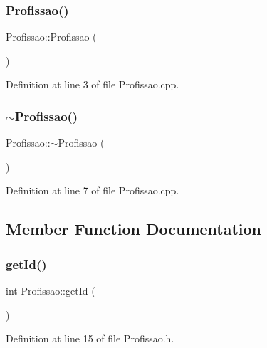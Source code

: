 \subsubsection{\texorpdfstring{Profissao()}{Profissao()}}
{\footnotesize\ttfamily Profissao\+::\+Profissao (\begin{DoxyParamCaption}{ }\end{DoxyParamCaption})}



Definition at line 3 of file Profissao.\+cpp.

\hypertarget{class_profissao_ae1f1d15fd068634e67858000dcc3f0cb}{}\label{class_profissao_ae1f1d15fd068634e67858000dcc3f0cb} 
\subsubsection{\texorpdfstring{$\sim$\+Profissao()}{~Profissao()}}
{\footnotesize\ttfamily Profissao\+::$\sim$\+Profissao (\begin{DoxyParamCaption}{ }\end{DoxyParamCaption})\hspace{0.3cm}{\ttfamily [virtual]}}



Definition at line 7 of file Profissao.\+cpp.



\subsection{Member Function Documentation}
\hypertarget{class_profissao_a8055e0438df191270a56c9154c38d46d}{}\label{class_profissao_a8055e0438df191270a56c9154c38d46d} 
\subsubsection{\texorpdfstring{get\+Id()}{getId()}}
{\footnotesize\ttfamily int Profissao\+::get\+Id (\begin{DoxyParamCaption}{ }\end{DoxyParamCaption})\hspace{0.3cm}{\ttfamily [inline]}}



Definition at line 15 of file Profissao.\+h.

\hypertarget{class_profissao_a81cc70bce0cc3e6966745d07e2c58bc2}{}\label{class_profissao_a81cc70bce0cc3e6966745d07e2c58bc2} 
